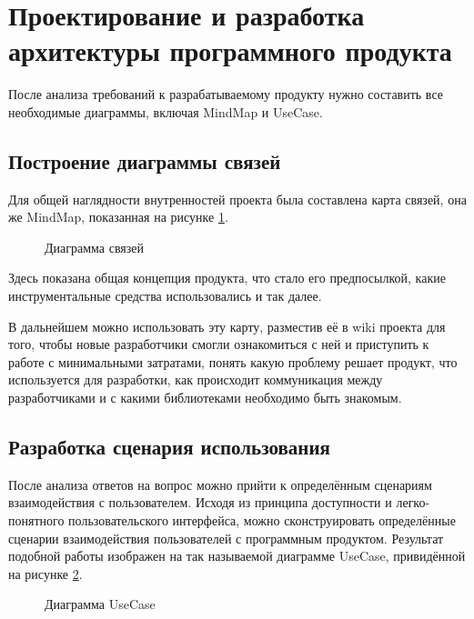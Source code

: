 \section{Проектирование и разработка архитектуры программного продукта}

После анализа требований к разрабатываемому продукту нужно составить все необходимые диаграммы, включая MindMap и UseCase.

\subsection{Построение диаграммы связей}

Для общей наглядности внутренностей проекта была составлена карта связей, она же MindMap, показанная на
рисунке \ref{des:mind_map}.

\begin{figure}[H]
    \caption{Диаграмма связей}
    \label{des:mind_map}
\end{figure}

Здесь показана общая концепция продукта, что стало его предпосылкой, какие инструментальные средства использовались
и так далее.

В дальнейшем можно использовать эту карту, разместив её в wiki проекта для того, чтобы новые разработчики смогли ознакомиться с ней
и приступить к работе с минимальными затратами, понять какую проблему решает продукт, что используется для разработки, как происходит
коммуникация между разработчиками и с какими библиотеками необходимо быть знакомым.

\subsection{Разработка сценария использования}

После анализа ответов на вопрос можно прийти к определённым сценариям взаимодействия с пользователем. Исходя из принципа доступности и легко-понятного
пользовательского интерфейса, можно сконструировать определённые сценарии взаимодействия пользователей с программным продуктом. Результат подобной работы
изображен на так называемой диаграмме UseCase, привидённой на рисунке \ref{des:use_case}.

\begin{figure}[H]
    \caption{Диаграмма UseCase}
    \label{des:use_case}
\end{figure}
